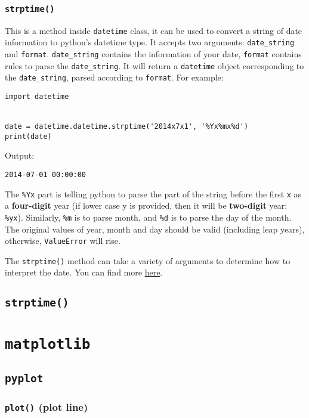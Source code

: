 \documentclass[12pt]{book}
\begin{document}
\subsection{\texttt{strptime()}}
\label{sec:org1d2213b}
This is a method inside \texttt{datetime} class, it can be used to convert a string of date information to python's datetime type. It accepts two arguments: \texttt{date\_string} and \texttt{format}. \texttt{date\_string} contains the information of your date, \texttt{format} contains rules to parse the \texttt{date\_string}. It will return a \texttt{datetime} object corresponding to the \texttt{date\_string}, parsed according to \texttt{format}. For example:
\begin{verbatim}
import datetime


date = datetime.datetime.strptime('2014x7x1', '%Yx%mx%d')
print(date)
\end{verbatim}
Output:
\begin{verbatim}
2014-07-01 00:00:00
\end{verbatim}
The \texttt{\%Yx} part is telling python to parse the part of the string before the first \texttt{x} as a \textbf{four-digit} year (if lower case y is provided, then it will be \textbf{two-digit} year: \texttt{\%yx}). Similarly, \texttt{\%m} is to parse month, and \texttt{\%d} is to parse the day of the month. The original values of year, month and day should be valid (including leap years), otherwise, \texttt{ValueError} will rise.

The \texttt{strptime()} method can take a variety of arguments to determine how to interpret the date. You can find more \href{https://docs.python.org/3/library/datetime.html\#strftime-and-strptime-behavior}{here}.

\section{\texttt{strptime()}}
\label{sec:org9ca3bbd}

\chapter{\texttt{matplotlib}}
\label{sec:org211ad6f}
\section{\texttt{pyplot}}
\label{sec:org5630ead}
\subsection{\texttt{plot()} (plot line)}
\label{sec:org80dea49}
\end{document}
